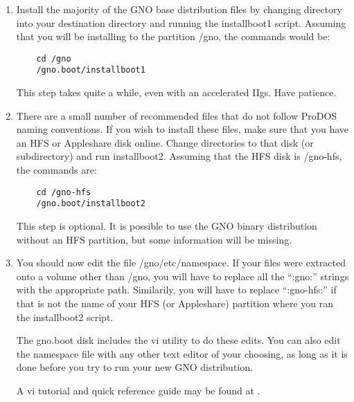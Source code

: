 \documentclass{report}
\begin{document}
\begin{enumerate}
\item
Install the majority of the GNO base distribution files by
changing directory into your destination directory and running the
installboot1
script. Assuming that you will be installing
to the partition 
/gno,
the commands would be:

\begin{verbatim}
	cd /gno
	/gno.boot/installboot1
\end{verbatim}

This step takes quite a while, even with an accelerated IIgs.
Have patience.

\item
There are a small number of recommended files that do not follow
ProDOS naming conventions.  If you wish to install these files,
make sure that you have an HFS or Appleshare disk online. Change
directories to that disk (or subdirectory) and run 
installboot2.
Assuming that the HFS disk is 
/gno-hfs,
the commands are:

\begin{verbatim}
	cd /gno-hfs
	/gno.boot/installboot2
\end{verbatim}

This step is optional.  It is possible to use the GNO binary
distribution without an HFS partition, but some information
will be missing.

\item
You should now edit the file /gno/etc/namespace.  If your
files were extracted onto a volume other than /gno, you will
have to replace all the ``:gno:'' strings with the appropriate
path.  Similarily, you will have to replace ``:gno-hfs:'' if
that is not the name of your HFS (or Appleshare) partition
where you ran the 
installboot2
script.

The 
gno.boot
disk includes the 
vi
utility to do these edits.
You can also edit the namespace file with any other text editor
of your choosing, as long as it is done before you try to run
your new GNO distribution.

A vi tutorial and quick reference guide may be found at
.

\begin{comment}
You may want to put /usr onto a different partition; it will
get fairly large over time.

If you have a RAM disk, you should consider having it renamed
to /tmp using renram5(8) or mktmp(8), in which case its entry
should be removed from the namespace file.


\end{comment}
\end{enumerate}
\end{document}

